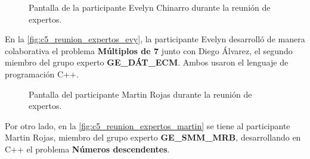 \begin{figure}
	\centering
	\caption[Reunión de Expertos - Evelyn Chinarro]{Pantalla de la participante Evelyn Chinarro durante la reunión de expertos.}
	\label{fig:c5_reunion_expertos_evy}
\end{figure}

En la \autoref{fig:c5_reunion_expertos_evy}, la participante Evelyn desarrolló de manera colaborativa el problema \textbf{Múltiplos de 7} junto con Diego Álvarez, el segundo miembro del grupo experto \textbf{GE\_DÁT\_ECM}. Ambos usaron el lenguaje de programación C++.\\

\begin{figure}
	\centering
	\caption[Reunión de Expertos - Martin Rojas]{Pantalla del participante Martin Rojas durante la reunión de expertos.}
	\label{fig:c5_reunion_expertos_martin}
\end{figure}

Por otro lado, en la \autoref{fig:c5_reunion_expertos_martin} se tiene al participante Martin Rojas, miembro del grupo experto \textbf{GE\_SMM\_MRB}, desarrollando en C++ el problema \textbf{Números descendentes}.\\

